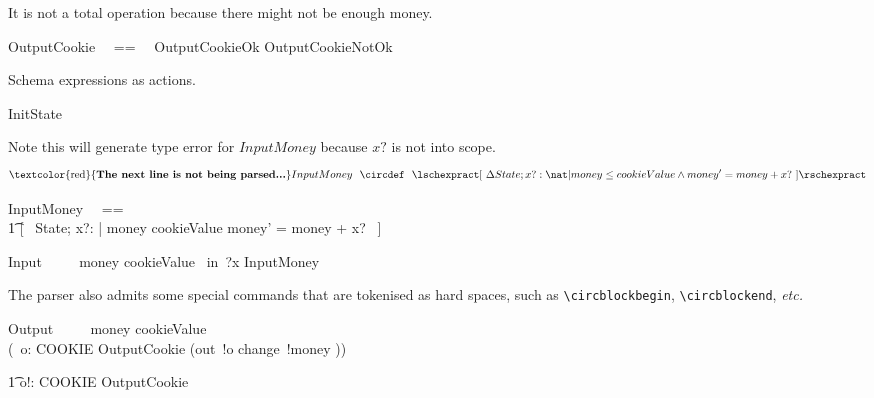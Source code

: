 \documentclass{article}
\begin{document}
It is not a total operation because there might not be enough money.
%
\begin{zed}
   OutputCookie ~~==~~ OutputCookieOk \lor OutputCookieNotOk
\end{zed}

Schema expressions as actions.
%
\begin{circusaction}
    InitState ~~\circdef~~ \lschexpract [~ State~' | money' = 0 \land quantity' = cookieQuantity ~] \rschexpract
\end{circusaction}

Note this will generate type error for $InputMoney$ because $x?$ is not into scope.
%
\[
\mbox{\textcolor{red}{\textbf{The next line is not being parsed...}}} \\
    InputMoney ~~\circdef~~ \lschexpract [~ \Delta State; x?: \nat | money \leq cookieValue \land money' = money + x? ~] \rschexpract
\]
%
\begin{zed}
    InputMoney ~~==~~ \\
        \t1 [~ \Delta State; x?: \nat | money \leq cookieValue \land money' = money + x? ~]
\end{zed}

\begin{circusaction}
   Input ~~\circdef~~ \lcircguard money \leq cookieValue \rcircguard  \circguard\ in~?x \then \lschexpract InputMoney \rschexpract \\
\end{circusaction}

The parser also admits some special commands that are tokenised as hard spaces, such as \verb'\circblockbegin', \verb'\circblockend', \textit{etc.}
%
\begin{circusaction}
    Output ~~\circdef~~
        \circblockbegin
            \lcircguard money \geq cookieValue \rcircguard \circguard\ \\
            (\circvar\ o: COOKIE \circspot \lschexpract OutputCookie \rschexpract \circseq (out~!o \then change~!money \then \Skip))
        \circblockend
\end{circusaction}

\begin{circusaction}
   \t1 \circspot \circvar o!: COOKIE \circspot OutputCookie %
\end{circusaction}

\begin{circus}
   \circend
\end{circus}

\CircusDeclSummary
\end{document}

